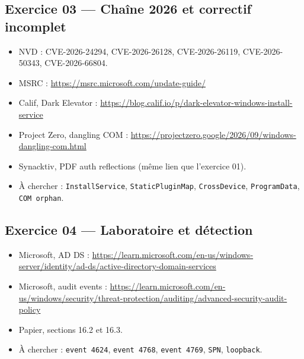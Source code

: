 \documentclass{training}
\begin{document}
\subsection*{Exercice 03 --- Chaîne 2026 et correctif incomplet}
\begin{itemize}
  \item NVD : CVE-2026-24294, CVE-2026-26128, CVE-2026-26119,
        CVE-2026-50343, CVE-2026-66804.
  \item MSRC :
        \url{https://msrc.microsoft.com/update-guide/}
  \item Calif, Dark Elevator :
        \url{https://blog.calif.io/p/dark-elevator-windows-install-service}
  \item Project Zero, dangling COM :
        \url{https://projectzero.google/2026/09/windows-dangling-com.html}
  \item Synacktiv, PDF auth reflections (même lien que l'exercice 01).
  \item À chercher : \texttt{InstallService}, \texttt{StaticPluginMap},
        \texttt{CrossDevice}, \texttt{ProgramData}, \texttt{COM orphan}.
\end{itemize}

\subsection*{Exercice 04 --- Laboratoire et détection}
\begin{itemize}
  \item Microsoft, AD DS :
        \url{https://learn.microsoft.com/en-us/windows-server/identity/ad-ds/active-directory-domain-services}
  \item Microsoft, audit events :
        \url{https://learn.microsoft.com/en-us/windows/security/threat-protection/auditing/advanced-security-audit-policy}
  \item Papier, sections 16.2 et 16.3.
  \item À chercher : \texttt{event 4624}, \texttt{event 4768},
        \texttt{event 4769}, \texttt{SPN}, \texttt{loopback}.
\end{itemize}
\end{document}

